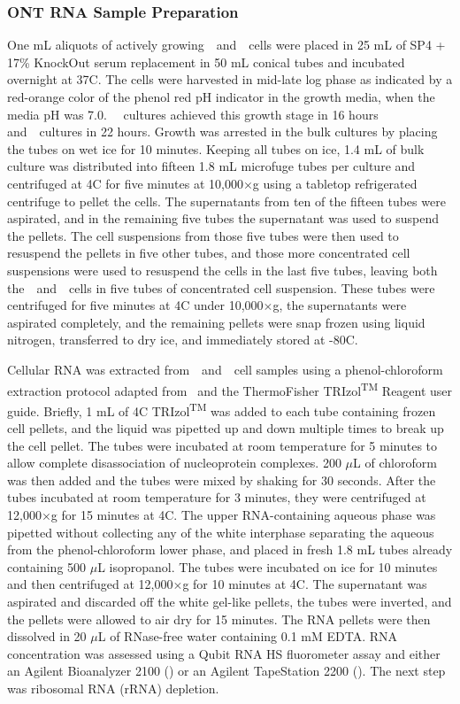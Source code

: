 \subsubsection{ONT RNA Sample Preparation}

One mL aliquots of actively growing~\jsyn~and~\jsyna~cells were placed in 25 mL of SP4 + 17\% KnockOut serum replacement in 50 mL conical tubes and incubated overnight at 37\textdegree C.
The cells were harvested in mid-late log phase as indicated by a red-orange color of the phenol red pH indicator in the growth media, when the media pH was 7.0.
~\syn~cultures achieved this growth stage in 16 hours and~\syna~cultures in 22 hours.
Growth was arrested in the bulk cultures by placing the tubes on wet ice for 10 minutes.
Keeping all tubes on ice, 1.4 mL of bulk culture was distributed into fifteen 1.8 mL microfuge tubes per culture and centrifuged at 4\textdegree C for five minutes at 10,000$\times$g using a tabletop refrigerated centrifuge to pellet the cells.
The supernatants from ten of the fifteen tubes were aspirated, and in the remaining five tubes the supernatant was used to suspend the pellets.
The cell suspensions from those five tubes were then used to resuspend the pellets in five other tubes, and those more concentrated cell suspensions were used to resuspend the cells in the last five tubes, leaving both the~\syn~and~\syna~cells in five tubes of concentrated cell suspension.
These tubes were centrifuged for five minutes at 4\textdegree C under 10,000$\times$g, the supernatants were aspirated completely, and the remaining pellets were snap frozen using liquid nitrogen, transferred to dry ice, and immediately stored at -80\textdegree C.

Cellular RNA was extracted from~\syn~and~\syna~cell samples using a phenol-chloroform extraction protocol adapted from~\cite{grunberger_next_2019} and the ThermoFisher TRIzol\textsuperscript{TM} Reagent user guide.
Briefly, 1 mL of 4\textdegree C TRIzol\textsuperscript{TM} was added to each tube containing frozen cell pellets, and the liquid was pipetted up and down multiple times to break up the cell pellet.
The tubes were incubated at room temperature for 5 minutes to allow complete disassociation of nucleoprotein complexes.
200 $\mu$L of chloroform was then added and the tubes were mixed by shaking for 30 seconds.
After the tubes incubated at room temperature for 3 minutes, they were centrifuged at 12,000$\times$g for 15 minutes at 4\textdegree C.
The upper RNA-containing aqueous phase was pipetted without collecting any of the white interphase separating the aqueous from the phenol-chloroform lower phase, and placed in fresh 1.8 mL tubes already containing 500 $\mu$L isopropanol.
The tubes were incubated on ice for 10 minutes and then centrifuged at 12,000$\times$g for 10 minutes at 4\textdegree C.
The supernatant was aspirated and discarded off the white gel-like pellets, the tubes were inverted, and the pellets were allowed to air dry for 15 minutes.
The RNA pellets were then dissolved in 20 $\mu$L of RNase-free water containing 0.1 mM EDTA.
RNA concentration was assessed using a Qubit RNA HS fluorometer assay and either an Agilent Bioanalyzer 2100 (\syn) or an Agilent TapeStation 2200 (\syna).
The next step was ribosomal RNA (rRNA) depletion.

